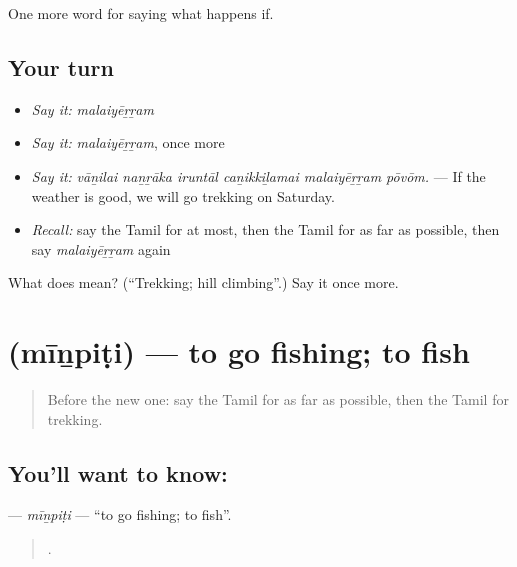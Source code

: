 \begin{grammarlens}[title={What you've built}]
One more word for saying what happens if.
\end{grammarlens}

\subsection*{Your turn}
\begin{itemize}
\raggedright
  \item \emph{Say it:} \emph{malaiyēṟṟam}
  \item \emph{Say it:} \emph{malaiyēṟṟam}, once more
  \item \emph{Say it:} \emph{vāṉilai naṉṟāka iruntāl caṉikkiḻamai malaiyēṟṟam pōvōm.} — If the weather is good, we will go trekking on Saturday.
  \item \emph{Recall:} say the Tamil for at most, then the Tamil for as far as possible, then say \emph{malaiyēṟṟam} again
\end{itemize}

\begin{tcolorbox}[breakable,colback=teal!4,colframe=teal!35!black,title={Before you move on}]
What does  mean? (\textquotedblleft{}Trekking; hill climbing\textquotedblright{}.) Say it once more.
\end{tcolorbox}
\section[\texorpdfstring{\ta{மீன்பிடி} (mīṉpiṭi)}{மீன்பிடி (mīṉpiṭi)}]{ (mīṉpiṭi) — to go fishing; to fish}

\label{lesson:TA-C554-minpiti}



\begin{quote}
Before the new one: say the Tamil for as far as possible, then the Tamil for trekking.
\end{quote}

\subsection*{You'll want to know: }
\textbf{} — \emph{mīṉpiṭi} — \textquotedblleft{}to go fishing; to fish\textquotedblright{}.

\begin{quote}
   .
\end{quote}

